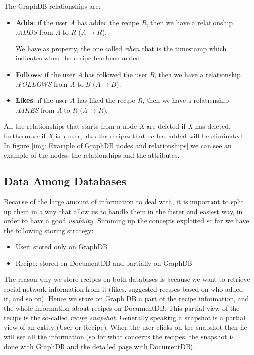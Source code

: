 \documentclass[a4paper]{report}
\begin{document}
\noindent The GraphDB relationships are:
\begin{itemize}
	\item \textbf{Adds}: if the user \emph{A} has added the recipe \emph{R}, then we have a relationship \emph{:ADDS} from \emph{A} to \emph{R} ($A \rightarrow R$).
	
	\noindent We have as property, the one called \emph{when} that is the timestamp which indicates when the recipe has been added.
	
	\item \textbf{Follows}: if the user \emph{A} has followed the user \emph{B}, then we have a relationship \emph{:FOLLOWS} from \emph{A} to \emph{B} ($A \rightarrow B$).
	
	\item \textbf{Likes}: if the user \emph{A} has liked the recipe \emph{R}, then we have a relationship \emph{:LIKES} from \emph{A} to \emph{R} ($A \rightarrow R$).
\end{itemize}  

\noindent All the relationships that starts from a node \emph{X} are deleted if \emph{X} has deleted, furthermore if \emph{X} is a user, also the recipes that he has added will be eliminated. In figure \ref{img: Example of GraphDB nodes and relationships} we can see an example of the nodes, the relationships and the attributes.


\subsection{Data Among Databases}
Because of the large amount of information to deal with, it is important to split up them in a way that allow us to handle them in the faster and easiest way, in order to have a good \emph{usability}. Summing up the concepts exploited so far we have the following storing strategy:
\begin{itemize}
	\item User: stored only on GraphDB
	\item Recipe: stored on DocumentDB and partially on GraphDB
\end{itemize}

\noindent The reason why we store recipes on both databases is because we want to retrieve social network information from it (likes, suggested recipes based on who added it, and so on). Hence we store on Graph DB a part of the recipe information, and the whole information about recipes on DocumentDB. This partial view of the recipe is the so-called \emph{recipe snapshot}. Generally speaking a snapshot is a partial view of an entity (User or Recipe). When the user clicks on the snapshot then he will see all the information (so for what concerns the recipes, the snapshot is done with GraphDB and the detailed page with DocumentDB).
\end{document}
